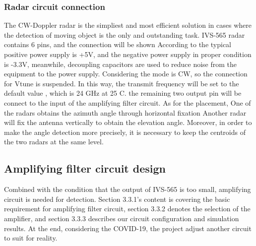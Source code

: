 \subsubsection{Radar circuit connection}
The CW-Doppler radar is the simpliest and most efficient solution in cases where the detection of moving object is the only and outstanding task. 
IVS-565 radar contains 6 pins, and the connection will be shown According to  \textcite{IVS-565}
the typical positive power supply is +5V, and the negative power supply in proper condition is -3.3V, meanwhile, decoupling capacitors are used to reduce noise from the equipment to the power supply. Considering the mode is CW, so the connection for Vtune is suspended. In this way, the transmit frequency will be set to the default value , which is 24 GHz at 25 C.
the remaining two output pin will be connect to the input of the amplifying filter circuit.
As for the placement, One of the radars obtains the azimuth angle through horizontal fixation
Another radar will fix the antenna vertically to obtain the elevation angle. Moreover, in order to make the angle detection more precisely, it is necessary to keep the centroids of the two radars at the same level. 
\subsection{Amplifying filter circuit design}
Combined with the condition that the output of IVS-565 is too small, amplifying circuit is needed for detection. Section 3.3.1’s content is covering the basic requirement for amplifying filter circuit, section 3.3.2 denotes the selection of the amplifier, and section 3.3.3 describes our circuit configuration and simulation results. At the end, considering the COVID-19, the project adjust another circuit to suit for reality.
